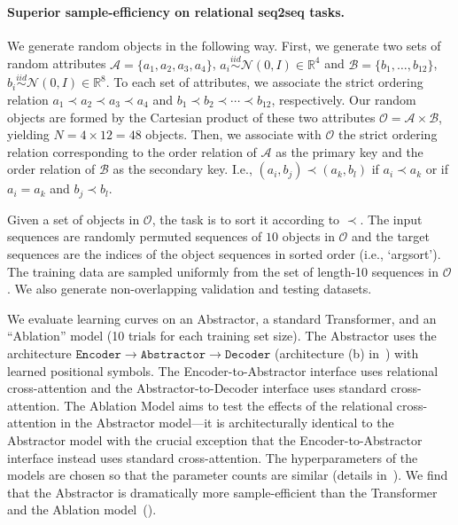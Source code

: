 \paragraph{Superior sample-efficiency on relational seq2seq tasks.}
We generate random objects in the following way. First, we generate two sets of random attributes $\mathcal{A} = \{a_1, a_2, a_3, a_4\}$, $a_i \overset{iid}{\sim} \mathcal{N}(0, I) \in \mathbb{R}^{4}$ and $\mathcal{B} = \{b_1, \ldots, b_{12}\}$, $b_i \overset{iid}{\sim} \mathcal{N}(0, I) \in \mathbb{R}^{8}$. To each set of attributes, we associate the strict ordering relation $a_1 \prec a_2 \prec a_3 \prec a_4$ and $b_1 \prec b_2 \prec \cdots \prec b_{12}$, respectively. Our random objects are formed by the Cartesian product of these two attributes $\mathcal{O} = \mathcal{A} \times \mathcal{B}$, yielding $N = 4 \times 12 = 48$ objects.
Then, we associate with $\mathcal{O}$ the strict ordering relation corresponding to the order relation of $\mathcal{A}$ as the primary key and the order relation of $\mathcal{B}$ as the secondary key. I.e., $(a_i, b_j) \prec (a_k, b_l)$ if $a_i \prec a_k$ or if $a_i = a_k$ and $b_j \prec b_l$.

Given a set of objects in $\mathcal{O}$, the task is to sort it according to $\prec$. The input sequences are randomly permuted sequences of $10$ objects in $\mathcal{O}$ and the target sequences are the indices of the object sequences in sorted order (i.e., `argsort'). The training data are sampled uniformly from the set of length-10 sequences in $\mathcal{O}$. We also generate non-overlapping validation and testing datasets.

We evaluate learning curves on an Abstractor, a standard Transformer, and an ``Ablation'' model (10 trials for each training set size). The Abstractor uses the architecture $\texttt{Encoder} \to \texttt{Abstractor} \to \texttt{Decoder}$ (architecture (b) in~) with learned positional symbols. The Encoder-to-Abstractor interface uses relational cross-attention and the Abstractor-to-Decoder interface uses standard cross-attention. The Ablation Model aims to test the effects of the relational cross-attention in the Abstractor model---it is architecturally identical to the Abstractor model with the crucial exception that the Encoder-to-Abstractor interface instead uses standard cross-attention. The hyperparameters of the models are chosen so that the parameter counts are similar (details in~). We find that the Abstractor is dramatically more sample-efficient than the Transformer and the Ablation model~().

